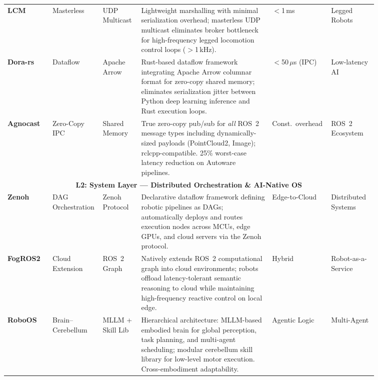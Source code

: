 \documentclass[acmsmall,screen,review,anonymous]{acmart}
\begin{document}
\begin{table}[t]
\begin{tabular}{
  p{0.11\linewidth}
  p{0.09\linewidth}
  p{0.10\linewidth}
  p{0.34\linewidth}
  p{0.10\linewidth}
  p{0.12\linewidth}
}
\textbf{LCM}~\cite{huang2010lcm} &
Masterless &
UDP Multicast &
Lightweight marshalling with minimal serialization overhead; masterless UDP multicast eliminates broker bottleneck for high-frequency legged locomotion control loops ($>$1\,kHz). &
$<$1\,ms &
Legged Robots \\

\textbf{Dora-rs}~\cite{han2024dora} &
Dataflow &
Apache Arrow &
Rust-based dataflow framework integrating Apache Arrow columnar format for zero-copy shared memory; eliminates serialization jitter between Python deep learning inference and Rust execution loops. &
$<$50\,$\mu$s (IPC) &
Low-latency AI \\

\textbf{Agnocast}~\cite{ishikawa2025agnocast} &
Zero-Copy IPC &
Shared Memory &
True zero-copy pub/sub for \emph{all} ROS~2 message types including dynamically-sized payloads (PointCloud2, Image); rclcpp-compatible. 25\% worst-case latency reduction on Autoware pipelines. &
Const.\ overhead &
ROS~2 Ecosystem \\

\midrule
\multicolumn{6}{c}{\textbf{L2: System Layer --- Distributed Orchestration \& AI-Native OS}} \\
\midrule

\textbf{Zenoh}~\cite{zenoh2024} &
DAG Orchestration &
Zenoh Protocol &
Declarative dataflow framework defining robotic pipelines as DAGs; automatically deploys and routes execution nodes across MCUs, edge GPUs, and cloud servers via the Zenoh protocol. &
Edge-to-Cloud &
Distributed Systems \\

\textbf{FogROS2}~\cite{ichnowski2022fogros2} &
Cloud Extension &
ROS~2 Graph &
Natively extends ROS~2 computational graph into cloud environments; robots offload latency-tolerant semantic reasoning to cloud while maintaining high-frequency reactive control on local edge. &
Hybrid &
Robot-as-a-Service \\

\textbf{RoboOS}~\cite{wang2025roboos} &
Brain--Cerebellum &
MLLM + Skill Lib &
Hierarchical architecture: MLLM-based embodied brain for global perception, task planning, and multi-agent scheduling; modular cerebellum skill library for low-level motor execution. Cross-embodiment adaptability. &
Agentic Logic &
Multi-Agent \\

\bottomrule
\end{tabular}
\end{table}
\end{document}
